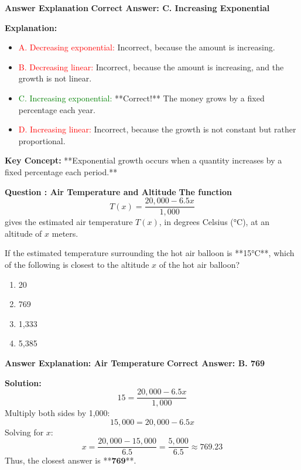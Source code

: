 \documentclass{beamer}
\begin{document}
\begin{frame}{\textbf{Answer Explanation}}
    \textbf{Correct Answer: \textcolor{novelPurple}{C. Increasing Exponential}}  

    \vspace{0.3cm}
    \textbf{Explanation:}
    \begin{itemize}
        \item \textcolor{red}{A. Decreasing exponential:} Incorrect, because the amount is increasing.
        \item \textcolor{red}{B. Decreasing linear:} Incorrect, because the amount is increasing, and the growth is not linear.
        \item \textcolor{green}{C. Increasing exponential:} **Correct!** The money grows by a fixed percentage each year.
        \item \textcolor{red}{D. Increasing linear:} Incorrect, because the growth is not constant but rather proportional.
    \end{itemize}
    
    \vspace{0.5cm}
    \textbf{Key Concept:} **Exponential growth occurs when a quantity increases by a fixed percentage each period.**
\end{frame}


\begin{frame}{\textbf{Question : Air Temperature and Altitude}}
    \textbf{The function} 
    \[
    T(x) = \frac{20,000 - 6.5x}{1,000}
    \]
    gives the estimated air temperature \( T(x) \), in degrees Celsius (°C), at an altitude of \( x \) meters.  

    \vspace{0.5cm}
    If the estimated temperature surrounding the hot air balloon is **15°C**, which of the following is closest to the altitude \( x \) of the hot air balloon?
    
    \vspace{0.5cm}
    \begin{enumerate}
        \item[A.] 20
        \item[B.] 769
        \item[C.] 1,333
        \item[D.] 5,385
    \end{enumerate}
\end{frame}

\begin{frame}{\textbf{Answer Explanation: Air Temperature}}
    \textbf{Correct Answer: \textcolor{novelPurple}{B. 769}}  

    \vspace{0.3cm}
    \textbf{Solution:}
    \[
    15 = \frac{20,000 - 6.5x}{1,000}
    \]
    Multiply both sides by 1,000:
    \[
    15,000 = 20,000 - 6.5x
    \]
    Solving for \( x \):
    \[
    x = \frac{20,000 - 15,000}{6.5} = \frac{5,000}{6.5} \approx 769.23
    \]
    Thus, the closest answer is **\( \mathbf{769} \)**.
\end{frame}
\end{document}
